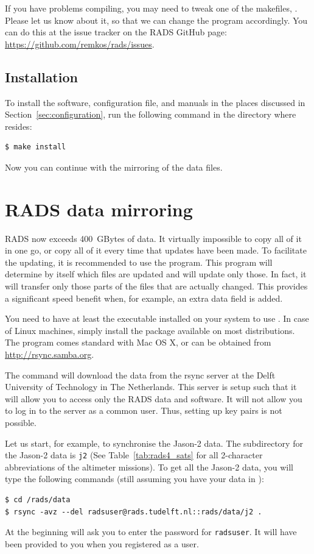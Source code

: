 \documentclass[a4paper,11pt,openany,natbib,nomargin]{thesis}
\begin{document}
If you have problems compiling, you may need to tweak one of the makefiles, . Please let us know about it, so that we can change the  program accordingly. You can do this at the issue tracker on the RADS GitHub page: \url{https://github.com/remkos/rads/issues}.

\section{Installation}
\label{sec:installation}
To install the software, configuration file, and manuals in the places discussed in Section~\ref{sec:configuration}, run the following command in the directory where  resides:
\begin{verbatim}
$ make install
\end{verbatim}

Now you can continue with the mirroring of the data files.

\chapter{RADS data mirroring}
\label{ch:mirroring}
RADS now exceeds 400~GBytes of data. It virtually impossible to copy all of it in one go, or copy all of it every time that updates have been made. To facilitate the updating, it is recommended to use the  program. This program will determine by itself which files are updated and will update only those. In fact, it will transfer only those parts of the files that are actually changed. This provides a significant speed benefit when, for example, an extra data field is added.

You need to have at least the executable  installed on your system to use . In case of Linux machines, simply install the  package available on most distributions. The program  comes standard with Mac OS X, or can be obtained from \url{http://rsync.samba.org}.

The  command will download the data from the rsync server at the Delft University of Technology in The Netherlands. This server is setup such that it will allow you to access only the RADS data and software. It will not allow you to log in to the server as a common user. Thus, setting up  key pairs is not possible.

Let us start, for example, to synchronise the Jason-2 data. The subdirectory for the Jason-2 data is \verb|j2| (See Table~\ref{tab:rads4_sats} for all 2-character abbreviations of the altimeter missions). To get all the Jason-2 data, you will type the following commands (still assuming you have your data in ):
\begin{verbatim}
$ cd /rads/data
$ rsync -avz --del radsuser@rads.tudelft.nl::rads/data/j2 .
\end{verbatim}
At the beginning  will ask you to enter the password for \verb|radsuser|. It will have been provided to you when you registered as a user.
\end{document}
